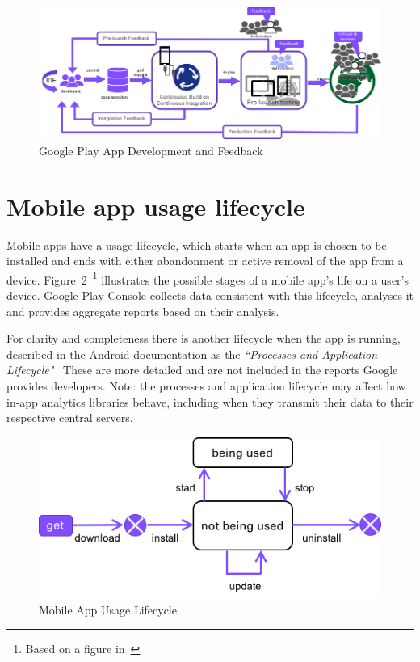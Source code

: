 \begin{figure}[ht]
    \centering
    \includegraphics[width=13cm]{images/google-play-app-development.png}
    \caption{Google Play App Development and Feedback}
    \label{fig:google-play-app-development-and-feedback}
\end{figure}


\section{Mobile app usage lifecycle}
Mobile apps have a usage lifecycle, which starts when an app is chosen to be installed and ends with either abandonment or active removal of the app from a device. Figure~\ref{fig:mobile_app_usage_lifecycle}~\footnote{Based on a figure in~\cite{bohmer2011falling_asleep_with_angry_birds}} illustrates the possible stages of a mobile app's life on a user's device. Google Play Console collects data consistent with this lifecycle, analyses it and provides aggregate reports based on their analysis. 

For clarity and completeness there is another lifecycle when the app is running, described in the Android documentation as the \emph{``Processes and Application Lifecycle"}~\cite{android_processes_and_application_lifecycle} These are more detailed and are not included in the reports Google provides developers. %
Note: the processes and application lifecycle may affect how in-app analytics libraries behave, including when they transmit their data to their respective central servers.


\begin{figure}[ht]
    \centering
    \includegraphics[width=12cm]{images/mobile_app_usage_lifecycle.png}
    \caption{Mobile App Usage Lifecycle}
    \label{fig:mobile_app_usage_lifecycle}
\end{figure}

